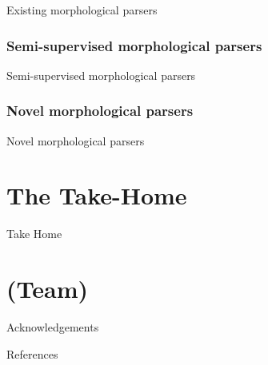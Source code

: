 \documentclass{beamer}
\begin{document}
\begin{frame}
Existing morphological parsers
\end{frame}




\subsubsection[Statistical]{Semi-supervised morphological parsers}

\begin{frame}
Semi-supervised morphological parsers
\end{frame}




\subsubsection[Novel]{Novel morphological parsers}

\begin{frame}
Novel morphological parsers
\end{frame}




\section{The Take-Home}

\begin{frame}
Take Home
\end{frame}

\section*{(Team)}

\begin{frame}
Acknowledgements
\end{frame}



\begin{frame}
References
\end{frame}
\end{document}
